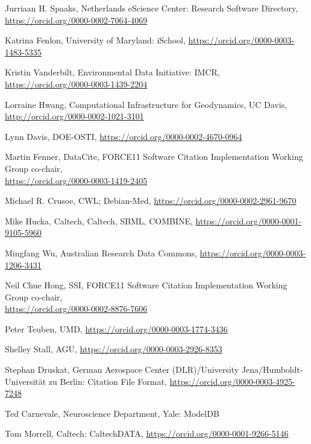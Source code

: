 \documentclass[11pt]{article}
\begin{document}
\begin{spacing}{0.86}
Jurriaan H. Spaaks, Netherlands eScience Center: Research Software
Directory,\\
\url{https://orcid.org/0000-0002-7064-4069}

Katrina Fenlon, University of Maryland: iSchool,
\url{https://orcid.org/0000-0003-1483-5335}

Kristin Vanderbilt, Environmental Data Initiative: IMCR,
\url{https://orcid.org/0000-0003-1439-2204}

Lorraine Hwang, Computational Infrastructure for Geodynamics, UC Davis,\\
\url{http://orcid.org/0000-0002-1021-3101}

Lynn Davis, DOE-OSTI, \url{https://orcid.org/0000-0002-4670-0964}

Martin Fenner, DataCite, FORCE11 Software Citation Implementation
Working Group co-chair,\\
\url{https://orcid.org/0000-0003-1419-2405}

Michael R. Crusoe, CWL; Debian-Med,
\url{https://orcid.org/0000-0002-2961-9670}

Mike Hucka, Caltech, Caltech, SBML, COMBINE,
\url{https://orcid.org/0000-0001-9105-5960}

Mingfang Wu, Australian Research Data Commons,
\url{https://orcid.org/0000-0003-1206-3431}

Neil Chue Hong, SSI, FORCE11 Software Citation Implementation Working
Group co-chair,\\
\url{https://orcid.org/0000-0002-8876-7606}

Peter Teuben, UMD,
\url{https://orcid.org/0000-0003-1774-3436}

Shelley Stall, AGU,
\url{https://orcid.org/0000-0003-2926-8353}

Stephan Druskat, German Aerospace Center (DLR)/University
Jena/Humboldt-Universität zu Berlin: Citation File Format,
\url{https://orcid.org/0000-0003-4925-7248}

Ted Carnevale, Neuroscience Department, Yale: ModelDB

Tom Morrell, Caltech: CaltechDATA,
\url{https://orcid.org/0000-0001-9266-5146}

\end{spacing}
\end{document}
